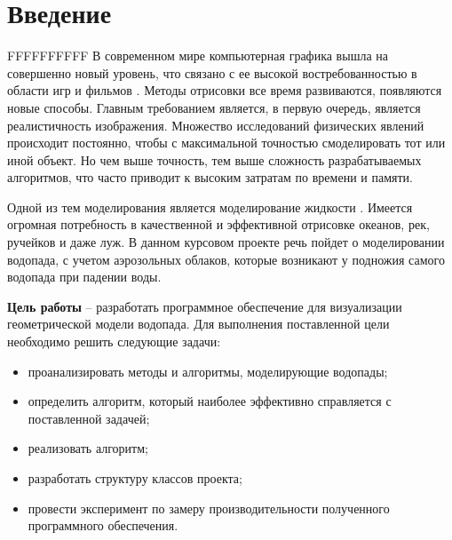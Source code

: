 \chapter*{Введение}


FFFFFFFFFF В современном мире компьютерная графика вышла на совершенно новый уровень, что связано с ее высокой востребованностью в области игр и фильмов \cite{realistic-water}. Методы отрисовки все время развиваются, появляются новые способы. Главным требованием является, в первую очередь, является реалистичность изображения. Множество исследований физических явлений происходит постоянно, чтобы с максимальной точностью смоделировать тот или иной объект. Но чем выше точность, тем выше сложность разрабатываемых алгоритмов, что часто приводит к высоким затратам по времени и памяти.

Одной из тем моделирования является моделирование жидкости \cite{water-matters}. Имеется огромная потребность в качественной и эффективной отрисовке океанов, рек, ручейков и даже луж. В данном курсовом проекте речь пойдет о моделировании водопада, с учетом аэрозольных облаков, которые возникают у подножия самого водопада при падении воды.

\textbf{Цель работы} -- разработать программное обеспечение для визуализации геометрической модели водопада. Для выполнения поставленной цели необходимо решить следующие задачи:

\begin{itemize}
	\item проанализировать методы и алгоритмы, моделирующие водопады; 
	\item определить алгоритм, который наиболее эффективно справляется с поставленной задачей;
	\item реализовать алгоритм;
	\item разработать структуру классов проекта;
	\item провести эксперимент по замеру производительности полученного программного обеспечения.
\end{itemize}
